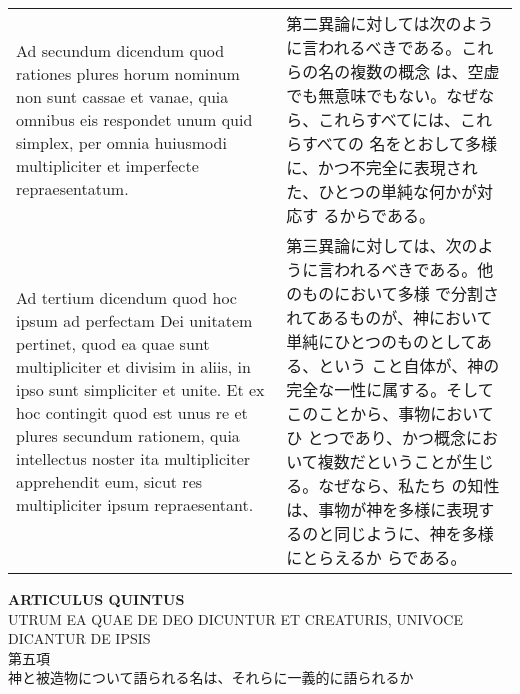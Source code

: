 \documentclass[10pt]{jsarticle}
\begin{document}
\begin{longtable}{p{21em}p{21em}}
\\

{\sc Ad secundum dicendum} quod rationes plures horum nominum non sunt
cassae et vanae, quia omnibus eis respondet unum quid simplex, per
omnia huiusmodi multipliciter et imperfecte repraesentatum.

&

第二異論に対しては次のように言われるべきである。これらの名の複数の概念
は、空虚でも無意味でもない。なぜなら、これらすべてには、これらすべての
名をとおして多様に、かつ不完全に表現された、ひとつの単純な何かが対応す
るからである。

\\

{\sc Ad tertium dicendum} quod hoc ipsum ad perfectam Dei unitatem
pertinet, quod ea quae sunt multipliciter et divisim in aliis, in ipso
sunt simpliciter et unite. Et ex hoc contingit quod est unus re et
plures secundum rationem, quia intellectus noster ita multipliciter
apprehendit eum, sicut res multipliciter ipsum repraesentant.

&

第三異論に対しては、次のように言われるべきである。他のものにおいて多様
で分割されてあるものが、神において単純にひとつのものとしてある、という
こと自体が、神の完全な一性に属する。そしてこのことから、事物においてひ
とつであり、かつ概念において複数だということが生じる。なぜなら、私たち
の知性は、事物が神を多様に表現するのと同じように、神を多様にとらえるか
らである。

\end{longtable}

\newpage
{}
\begin{center}
{\Large {\bf ARTICULUS QUINTUS}}\\
{UTRUM EA QUAE DE DEO DICUNTUR ET CREATURIS, UNIVOCE DICANTUR DE IPSIS}
\\{\large 第五項\\神と被造物について語られる名は、それらに一義的に語られるか}
\end{center}
\end{document}
